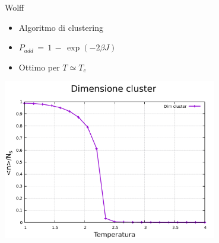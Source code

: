 \begin{frame}
\begin{columns}
\begin{column}{0.5\textwidth}
\begin{block}{Wolff}
                \begin{itemize}[itemsep=0.5em, label=$\diamond$]
                    \item Algoritmo di clustering
                    \item $P_{add}\,=\,1\,-\,\exp{\left(-2\beta J\right)}$
                    \item Ottimo per $T \simeq T_c$
                \end{itemize}

                \centering
                \includegraphics[width=0.7\textwidth]{Immagini/metodiNumerici/dimClFlip.pdf}			
            
            \end{block}
        \end{column}
      \end{columns}
  
\end{frame}


